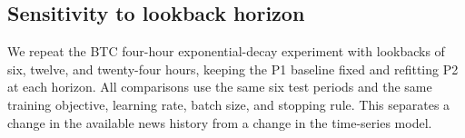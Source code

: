 \subsection*{Sensitivity to lookback horizon}
We repeat the BTC four-hour exponential-decay experiment with lookbacks
of six, twelve, and twenty-four hours, keeping the P1 baseline fixed
and refitting P2 at each horizon. All comparisons use the same six
test periods and the same training objective, learning rate, batch
size, and stopping rule. This separates a change in the available
news history from a change in the time-series model.

\begin{table}[htbp]
\centering\small
\caption{Sensitivity to the news lookback (4-Hour RV, BTC)}\label{tab:lookback}

\end{table}


